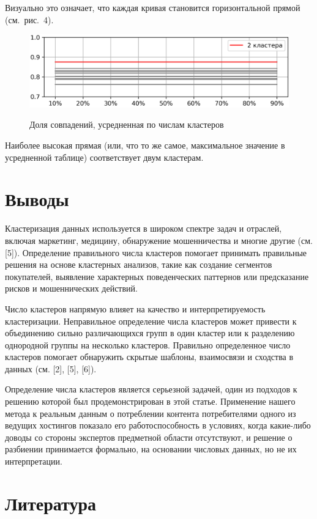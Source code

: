 \documentclass[a4paper,12pt]{article}
\begin{document}
Визуально это означает, что каждая кривая становится горизонтальной прямой (см. рис. 4).



\begin{figure}[!h]
	\centering
	\includegraphics[width=0.8\linewidth]{pictures/Проценты-доля.Средние}
	\\
	\caption{Доля совпадений, усредненная по числам кластеров}
\end{figure}


Наиболее высокая прямая (или, что то же самое, максимальное значение в усредненной таблице) соответствует двум кластерам.


\section{Выводы}
	
Кластеризация данных используется в широком спектре задач и отраслей, включая маркетинг, медицину, обнаружение мошенничества и многие другие (см. [5]). Определение правильного числа кластеров помогает принимать правильные решения на основе кластерных анализов, такие как создание сегментов покупателей, выявление характерных поведенческих паттернов или предсказание рисков и мошеннических действий.

Число кластеров напрямую влияет на качество и интерпретируемость кластеризации. Неправильное определение числа кластеров может привести к объединению сильно различающихся групп в один кластер или к разделению однородной группы на несколько кластеров. Правильно определенное число кластеров помогает обнаружить скрытые шаблоны, взаимосвязи и сходства в данных (см. [2], [5], [6]).

Определение числа кластеров является серьезной задачей, один из подходов к решению которой был продемонстрирован в этой статье. Применение нашего метода к реальным данным о потреблении контента потребителями одного из ведущих хостингов показало его работоспособность в условиях, когда какие-либо доводы со стороны экспертов предметной области отсутствуют, и решение о разбиении принимается формально, на основании числовых данных, но не их интерпретации.


\section{Литература}
\end{document}
